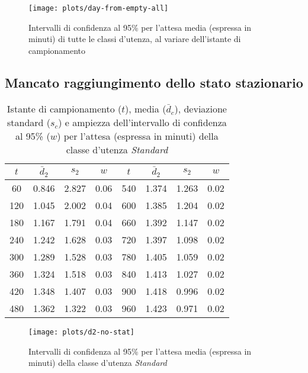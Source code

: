 \captionsetup[figure]{justification=centering}
\begin{figure}[ht]
\centering
\texttt{[image: plots/day-from-empty-all]}
\caption{Intervalli di confidenza al 95\% per l'attesa media (espressa in minuti) di tutte le classi d'utenza, al variare dell'istante di campionamento}
\label{fig:esperimenti-simulazione-3}
\end{figure}

\subsection*{Mancato raggiungimento dello stato stazionario}
\captionsetup[table]{justification=centering}
\begin{table}[ht]
\centering
{\tablecolors
\begin{tabular}{|c|c|c|c||c|c|c|c|}
\hline
$t$ & $\bar{d}_2$ & $s_2$ & $w$ & $t$ & $\bar{d}_2$ & $s_2$ & $w$ \\
\hline
60 & 0.846 & 2.827 & 0.06 & 540 & 1.374 & 1.263 & 0.02 \\
\hline
120 & 1.045 & 2.002 & 0.04 & 600 & 1.385 & 1.204 & 0.02 \\
\hline
180 & 1.167 & 1.791 & 0.04 & 660 & 1.392 & 1.147 & 0.02 \\
\hline
240 & 1.242 & 1.628 & 0.03 & 720 & 1.397 & 1.098 & 0.02 \\
\hline
300 & 1.289 & 1.528 & 0.03 & 780 & 1.405 & 1.059 & 0.02 \\
\hline
360 & 1.324 & 1.518 & 0.03 & 840 & 1.413 & 1.027 & 0.02 \\
\hline
420 & 1.348 & 1.407 & 0.03 & 900 & 1.418 & 0.996 & 0.02 \\
\hline
480 & 1.362 & 1.322 & 0.03 & 960 & 1.423 & 0.971 & 0.02 \\
\hline
\end{tabular}}
\caption{Istante di campionamento ($t$), media ($\bar{d}_c$), deviazione standard ($s_c$) e ampiezza dell'intervallo di confidenza al 95\% ($w$) per l'attesa (espressa in minuti) della classe d'utenza \uo{} \textsl{Standard}}
\label{table:esperimenti-simulazione-3}
\end{table}

\captionsetup[figure]{justification=centering}
\begin{figure}[ht!]
\centering
\texttt{[image: plots/d2-no-stat]}
\caption{Intervalli di confidenza al 95\% per l'attesa media (espressa in minuti) della classe d'utenza \uo{} \textsl{Standard}}
\label{fig:esperimenti-simulazione-4}
\end{figure}